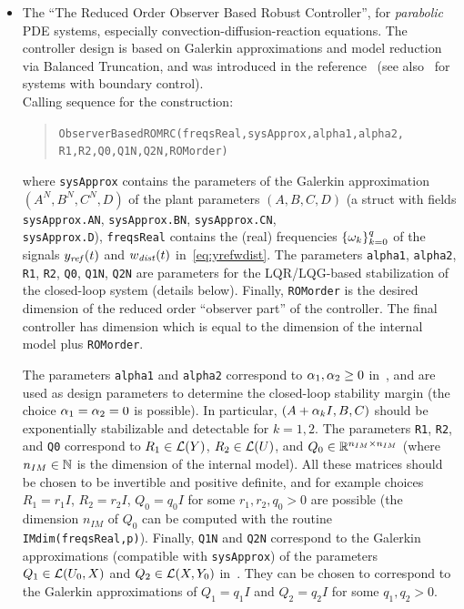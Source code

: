\documentclass[11pt, a4paper]{amsart}
\theoremstyle{definition}
\numberwithin{equation}{section}
\newcommand{\yref}{y_{\mbox{\scriptsize\textit{ref}}}}
\newcommand{\wdist}{w_{\mbox{\scriptsize\textit{dist}}}}
\begin{document}
\begin{itemize}
\item 
The ``The Reduced Order Observer Based Robust Controller'', for \emph{parabolic} PDE systems, especially convection-diffusion-reaction equations. The controller design is based on Galerkin approximations and model reduction via Balanced Truncation, and was introduced in the reference~\cite{PauPha20} (see also~\cite{PhaPau21} for systems with boundary control).\\[1ex]
      Calling sequence for the construction:\\[-1ex]
     \begin{quotation}
       \hspace{-1cm}\texttt{ObserverBasedROMRC(freqsReal,sysApprox,alpha1,alpha2,\\ 
	 \phantom{a}\hspace{3.0cm} R1,R2,Q0,Q1N,Q2N,ROMorder)}
     \end{quotation}
     \medskip
     where \texttt{sysApprox} contains the parameters of the Galerkin approximation $(A^N,B^N,C^N,D)$ of the plant parameters $(A,B,C,D)$ (a struct with fields \texttt{sysApprox.AN}, \texttt{sysApprox.BN}, \texttt{sysApprox.CN}, \\ \texttt{sysApprox.D}), \texttt{freqsReal} contains the (real) frequencies $\{\omega_k\}_{k=0}^q$ of the signals $\yref(t)$ and $\wdist(t)$ in~\eqref{eq:yrefwdist}.
The parameters \texttt{alpha1}, \texttt{alpha2},
\texttt{R1}, \texttt{R2}, \texttt{Q0}, \texttt{Q1N}, \texttt{Q2N} are parameters for the LQR/LQG-based stabilization of the closed-loop system (details below). Finally, \texttt{ROMorder} is the desired dimension of the reduced order ``observer part'' of the controller. The final controller has dimension which is equal to the dimension of the internal model plus \texttt{ROMorder}.

The parameters \texttt{alpha1} and \texttt{alpha2} correspond to $\alpha_1,\alpha_2\geq 0$ in~, and are used as design parameters to determine the closed-loop stability margin (the choice $\alpha_1=\alpha_2=0$ is possible). In particular, $(A+\alpha_k I,B,C)$ should be exponentially stabilizable and detectable for $k=1,2$.
The parameters 
\texttt{R1}, \texttt{R2}, and \texttt{Q0} correspond to $R_1\in {\mathcal{L}}(Y)$, $R_2\in {\mathcal{L}}(U)$, and $Q_0\in {\mathbb{R}}^{n_{IM}\times n_{IM}}$ (where $n_{IM}\in {\mathbb{N}}$ is the dimension of the internal model). All these matrices should be chosen to be invertible and positive definite, and for example choices $R_1=r_1 I$, $R_2=r_2 I$, $Q_0=q_0 I$ for some $r_1,r_2,q_0>0$ are possible
 (the dimension $n_{IM}$ of $Q_0$ can be computed with the routine \texttt{IMdim(freqsReal,p)}). Finally,
\texttt{Q1N} and \texttt{Q2N} correspond to  the Galerkin approximations (compatible with \texttt{sysApprox}) of the parameters $Q_1\in {\mathcal{L}}(U_0,X)$ and $Q_2\in {\mathcal{L}}(X,Y_0)$ in~. They
can be chosen to correspond to the Galerkin approximations of $Q_1=q_1 I$ and $Q_2=q_2 I$ for some  $q_1,q_2>0$.


\end{itemize}
\end{document}

